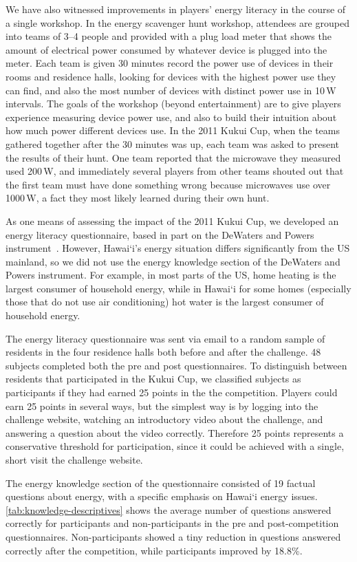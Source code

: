 \documentclass{sigchi}
\newcommand{\Hawaii}{Hawai`i\xspace}
\begin{document}
We have also witnessed improvements in players' energy literacy in the course of a single workshop. In the energy scavenger hunt workshop, attendees are grouped into teams of 3--4 people and provided with a plug load meter that shows the amount of electrical power consumed by whatever device is plugged into the meter. Each team is given 30 minutes record the power use of devices in their rooms and residence halls, looking for devices with the highest power use they can find, and also the most number of devices with distinct power use in 10\,W intervals. The goals of the workshop (beyond entertainment) are to give players experience measuring device power use, and also to build their intuition about how much power different devices use. In the 2011 Kukui Cup, when the teams gathered together after the 30 minutes was up, each team was asked to present the results of their hunt. One team reported that the microwave they measured used 200\,W, and immediately several players from other teams shouted out that the first team must have done something wrong because microwaves use over 1000\,W, a fact they most likely learned during their own hunt.

As one means of assessing the impact of the 2011 Kukui Cup, we developed an energy literacy questionnaire, based in part on the DeWaters and Powers instrument~\cite{DeWaters2011}. However, \Hawaii's energy situation differs significantly from the US mainland, so we did not use the energy knowledge section of the DeWaters and Powers instrument. For example, in most parts of the US, home heating is the largest consumer of household energy, while in \Hawaii for some homes (especially those that do not use air conditioning) hot water is the largest consumer of household energy.

The energy literacy questionnaire was sent via email to a random sample of residents in the four residence halls both before and after the challenge. 48 subjects completed both the pre and post questionnaires. To distinguish between residents that participated in the Kukui Cup, we classified subjects as participants if they had earned 25 points in the the competition. Players could earn 25 points in several ways, but the simplest way is by logging into the challenge website, watching an introductory video about the challenge, and answering a question about the video correctly. Therefore 25 points represents a conservative threshold for participation, since it could be achieved with a single, short visit the challenge website.

The energy knowledge section of the questionnaire consisted of 19 factual questions about energy, with a specific emphasis on \Hawaii energy issues. \autoref{tab:knowledge-descriptives} shows the average number of questions answered correctly for participants and non-participants in the pre and post-competition questionnaires. Non-participants showed a tiny reduction in questions answered correctly after the competition, while participants improved by 18.8\%.
\end{document}
